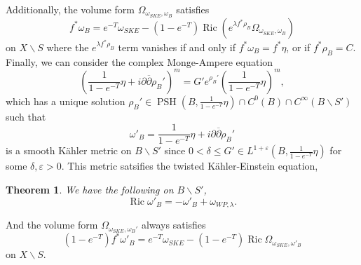 \documentclass[12pt]{article}
\newtheorem{theorem}{Theorem}[section]
\numberwithin{equation}{section}
\renewcommand{\d}{\partial}
\newcommand{\dbar}{\overline{\partial}}
\newcommand{\e}{\varepsilon}
\DeclareMathOperator{\Ric}{Ric}
\DeclareMathOperator{\PSH}{PSH}
\begin{document}
\noindent Additionally, the volume form $\Omega_{\omega_{SKE}, \omega_B}$ satisfies
\begin{equation}\label{base_metric_3_volume_form_ric_curvature}
    f^*\omega_B = e^{-T} \omega_{SKE} - (1-e^{-T})\Ric(e^{\lambda f^*\rho_B} \Omega_{\omega_{SKE}, \omega_B})
\end{equation}
on $X \backslash S$ where the $e^{\lambda f^*\rho_B}$ term vanishes if and only if $f^*\omega_B = f^*\eta$, or if $f^*\rho_B = C$.\\ 

\noindent Finally, we can consider the complex Monge-Ampere equation
\begin{equation*}
    \left(\frac{1}{1-e^{-T}} \eta + i\d\dbar \rho_B'\right)^m =  G'e^{\rho_B'} \left(\frac{1}{1-e^{-T}}\eta\right)^m,
\end{equation*}
which has a unique solution $\rho_B' \in \PSH\left(B,\frac{1}{1-e^{-T}}\eta\right) \cap C^0(B) \cap C^\infty(B\backslash S')$ such that
\begin{equation*}
    \omega'_B = \frac{1}{1-e^{-T}}\eta + i\d\dbar \rho_B'
\end{equation*}
is a smooth K\"ahler metric on $B\backslash S'$ since $0 < \delta \leq G' \in L^{1+ \e}\left(B, \frac{1}{1-e^{-T}}\eta\right)$ for some $\delta, \e > 0$. This metric satsifies the twisted K\"ahler-Einstein equation,
\begin{theorem}
We have the following on $B \backslash S'$,
\begin{equation*}
    \Ric \omega'_B = -\omega'_B + \omega_{WP,\lambda}.
\end{equation*}
\end{theorem}
\noindent And the volume form $\Omega_{\omega_{SKE},\omega_B'}$ always satisfies
\begin{equation}\label{base_metric_4_volume_form_ric_curvature} 
    (1-e^{-T})f^*\omega'_B = e^{-T}\omega_{SKE} - (1-e^{-T})\Ric \Omega_{\omega_{SKE},\omega'_B}
\end{equation}
on $X \backslash S$.
\end{document}

